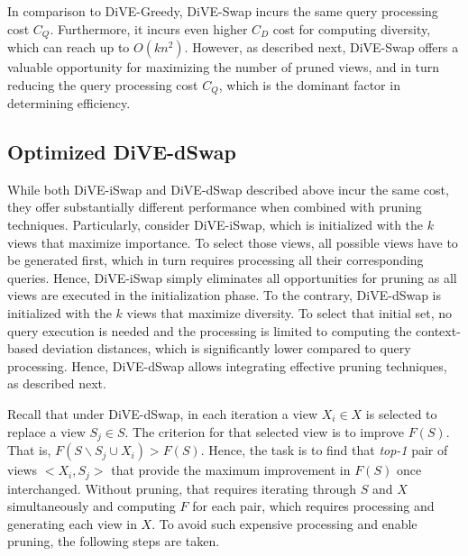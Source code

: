 In comparison to DiVE-Greedy, DiVE-Swap incurs the same query processing cost $C_Q$. 
%
Furthermore, it incurs even higher $C_D$ cost for computing diversity, which can reach up to $ O\left(kn^2 \right) $. 
%
However, as described next, DiVE-Swap offers a valuable opportunity for maximizing the number of pruned views, and in turn reducing the query processing cost $C_Q$, which is the dominant factor in determining  efficiency.   



\subsection{Optimized DiVE-dSwap}
\label{subsec:dive-dswap}

While both DiVE-iSwap and DiVE-dSwap described above incur the same cost, they offer substantially different performance when combined with pruning techniques. 
%
Particularly, consider DiVE-iSwap, which is initialized with the $k$ views that maximize importance. 
%
To select those views, all possible views have to be generated first, which in turn requires processing all their corresponding queries. 
%
Hence, DiVE-iSwap simply eliminates all opportunities for pruning as all views are executed in the initialization phase. 
%
To the contrary, DiVE-dSwap is initialized with the $k$ views that maximize diversity.
%
To select that initial set, no query execution is needed and the processing is limited to computing the context-based deviation distances, which is significantly lower compared to query processing. 
%
Hence, DiVE-dSwap allows integrating effective pruning techniques, as described next. 

Recall that under DiVE-dSwap, in each iteration a view $X_i \in X$ is selected to replace a view $S_j \in S$. 
%
The criterion for that selected view is to improve $F\left(S\right)$. 
%
That is, $F(S \backslash S_j \cup X_i) >  F(S)$. 
%
Hence, the task is to find that {\em top-1} pair of views $<X_i, S_j>$ that provide the maximum improvement in $F\left(S\right)$ once interchanged. 
%
Without pruning, that requires iterating through $S$ and $X$ simultaneously and computing $F$ for each pair, which requires processing and generating each view in $X$. 
%
To avoid such expensive processing and enable pruning, the following steps are taken. 
%

